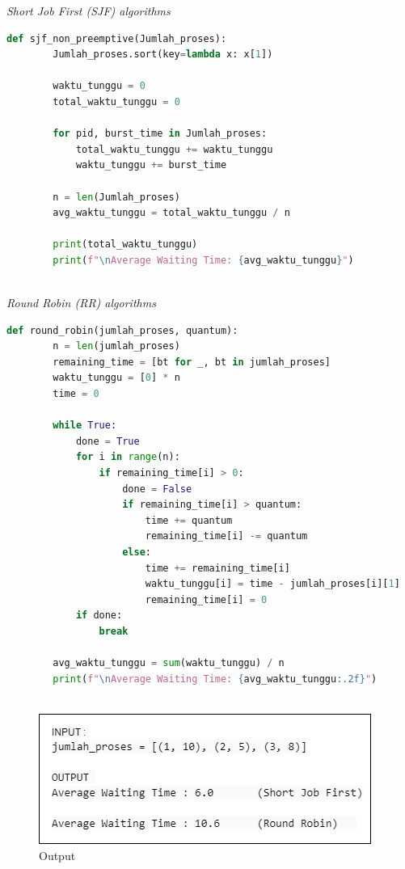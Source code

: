 \documentclass[12pt]{article}
\begin{document}
\textit{Short Job First (SJF) algorithms}
\begin{lstlisting}[language=Python]
    def sjf_non_preemptive(Jumlah_proses):
        Jumlah_proses.sort(key=lambda x: x[1])
    
        waktu_tunggu = 0
        total_waktu_tunggu = 0
    
        for pid, burst_time in Jumlah_proses:
            total_waktu_tunggu += waktu_tunggu
            waktu_tunggu += burst_time
    
        n = len(Jumlah_proses)
        avg_waktu_tunggu = total_waktu_tunggu / n
    
        print(total_waktu_tunggu)
        print(f"\nAverage Waiting Time: {avg_waktu_tunggu}")    
    
\end{lstlisting}

\textit{Round Robin (RR) algorithms}
\begin{lstlisting}[language=Python]
    def round_robin(jumlah_proses, quantum):
        n = len(jumlah_proses)
        remaining_time = [bt for _, bt in jumlah_proses]
        waktu_tunggu = [0] * n
        time = 0
    
        while True:
            done = True
            for i in range(n):
                if remaining_time[i] > 0:
                    done = False
                    if remaining_time[i] > quantum:
                        time += quantum
                        remaining_time[i] -= quantum
                    else:
                        time += remaining_time[i]
                        waktu_tunggu[i] = time - jumlah_proses[i][1]
                        remaining_time[i] = 0
            if done:
                break
    
        avg_waktu_tunggu = sum(waktu_tunggu) / n
        print(f"\nAverage Waiting Time: {avg_waktu_tunggu:.2f}")
    
\end{lstlisting}

\begin{figure}[H]
    \centering
    \includegraphics[width=1\linewidth]{asset/41.png}
    \caption{Output}
\end{figure}
\end{document}
